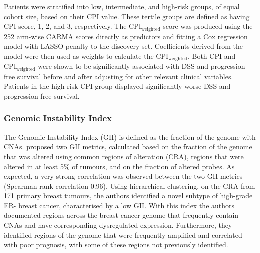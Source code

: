 Patients were stratified into low, intermediate, and high-risk groups, of equal cohort size, based on their CPI value. These tertile groups are defined as having CPI score, 1, 2, and 3, respectively. The $\text{CPI}_\text{weighted}$ score was produced using the 252 arm-wise CARMA scores directly as predictors and fitting a Cox regression model with LASSO penalty to the discovery set. Coefficients derived from the model were then used as weights to calculate the $\text{CPI}_\text{weighted}$. Both CPI and $\text{CPI}_\text{weighted}$ were shown to be significantly associated with DSS and progression-free survival before and after adjusting for other relevant clinical variables. Patients in the high-risk CPI group displayed significantly worse DSS and progression-free survival.

\subsubsection{Genomic Instability Index}
The Genomic Instability Index (GII) is defined as the fraction of the genome with CNAs. \cite{pmid17925008} proposed two GII metrics, calculated based on the fraction of the genome that was altered using common regions of alteration (CRA), regions that were altered in at least 5\% of tumours, and on the fraction of altered probes. As expected, a very strong correlation was observed between the two GII metrics (Spearman rank correlation 0.96). Using hierarchical clustering, on the CRA from 171 primary breast tumours, the authors identified a novel subtype of high-grade ER- breast cancer, characterised by a low GII. With this index the authors documented regions across the breast cancer genome that frequently contain CNAs and have corresponding dysregulated expression. Furthermore, they identified regions of the genome that were frequently amplified and correlated with poor prognosis, with some of these regions not previously identified. 


